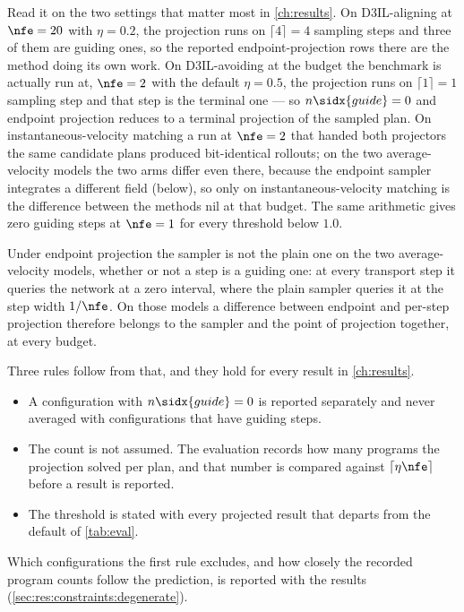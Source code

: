 Read it on the two settings that matter most in \autoref{ch:results}. On D3IL-aligning at
$\nfe=20$ with $\eta=0.2$, the projection runs on $\lceil 4 \rceil = 4$ sampling steps and three of them
are guiding ones, so the reported endpoint-projection rows there are the method doing its own work. On
D3IL-avoiding at the budget the benchmark is actually run at, $\nfe=2$ with the default $\eta=0.5$, the
projection runs on $\lceil 1 \rceil = 1$ sampling step and that step is the terminal one --- so
$n\sidx{guide}=0$ and endpoint projection reduces to a terminal projection of the sampled plan. On
instantaneous-velocity matching a run at $\nfe=2$ that handed both projectors the same candidate plans
produced bit-identical rollouts; on the two average-velocity models the two arms differ even there, because
the endpoint sampler integrates a different field (below), so only on instantaneous-velocity matching is the
difference between the methods nil at that budget. The same arithmetic gives zero guiding steps at $\nfe=1$
for every threshold below $1.0$.

Under endpoint projection the sampler is not the plain one on the two average-velocity models, whether or
not a step is a guiding one: at every transport step it queries the network at a zero interval, where the
plain sampler queries it at the step width $1/\nfe$. On those models a difference between endpoint and
per-step projection therefore belongs to the sampler and the point of projection together, at every budget.

Three rules follow from that, and they hold for every result in \autoref{ch:results}.

\begin{itemize}
  \item A configuration with $n\sidx{guide}=0$ is reported separately and never averaged with
    configurations that have guiding steps.
  \item The count is not assumed. The evaluation records how many programs the projection solved per
    plan, and that number is compared against $\lceil \eta\nfe \rceil$ before a result is reported.
  \item The threshold is stated with every projected result that departs from the default of
    \autoref{tab:eval}.
\end{itemize}

Which configurations the first rule excludes, and how closely the recorded program counts follow the
prediction, is reported with the results (\autoref{sec:res:constraints:degenerate}).
